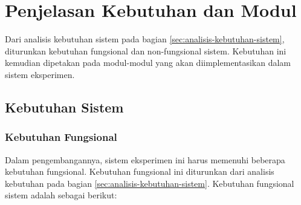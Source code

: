 \chapter{Penjelasan Kebutuhan dan Modul}
\label{appendix:modules}

Dari analisis kebutuhan sistem pada bagian \ref{sec:analisis-kebutuhan-sistem}, diturunkan kebutuhan fungsional dan non-fungsional sistem. Kebutuhan ini kemudian dipetakan pada modul-modul yang akan diimplementasikan dalam sistem eksperimen.

\section{Kebutuhan Sistem} 
\label{appendix:system-requirements}
\subsection{Kebutuhan Fungsional}
Dalam pengembangannya, sistem eksperimen ini harus memenuhi beberapa kebutuhan fungsional. Kebutuhan fungsional ini diturunkan dari analisis kebutuhan pada bagian \ref{sec:analisis-kebutuhan-sistem}. Kebutuhan fungsional sistem adalah sebagai berikut:

